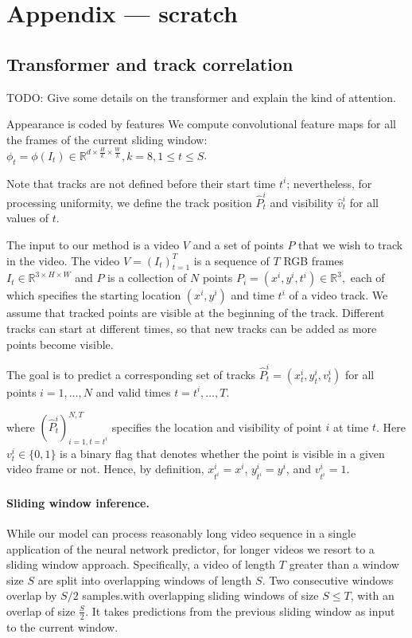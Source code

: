 \appendix\section{Appendix --- scratch}

\subsection{Transformer and track correlation}

TODO: Give some details on the transformer and explain the kind of attention.

Appearance is coded by features We compute convolutional feature maps for all the frames of the current sliding window: $\phi_t = \phi(I_t) \in \mathbb{R}^{d\times \frac{H}{k} \times \frac{W}{k}}, k=8,  1 \leq t \leq S$.


Note that tracks are not defined before their start time $t^i$; nevertheless, for processing uniformity, we define the track position $\hat P^i_t$ and visibility $\hat v^i_t$ for all values of $t$.

The input to our method is a video $V$ and a set of points $P$ that we wish to track in the video.
The video $V = (I_t)_{t=1}^T$ is a sequence of $T$ RGB frames $I_t \in \mathbb{R}^{3 \times H \times W}$ and $P$ is a collection of $N$ points
$
P_i = (x^i, y^i, t^i) \in \mathbb{R}^{3},
$
each of which specifies the starting location $(x^i, y^i)$ and time $t^i$ of a video track.
We assume that tracked points are visible at the beginning of the track.
Different tracks can start at different times, so that new tracks can be added as more points become visible.

The goal is to predict a corresponding set of tracks
$
\hat P_t^i = (x_t^i, y_t^i, v_t^i)
$
for all points $i=1,\dots,N$ and valid times $t=t^i,\dots,T$.



where
$
(\hat P_t^i)_{i=1,t=t^i}^{N,T}
$
specifies the location and visibility of point $i$ at time $t$.
Here $v_t^i \in \{0,1\}$ is a binary flag that denotes whether the point is visible in a given video frame or not.
Hence, by definition,
$
x_{t^i}^i = x^i
$,
$
y_{t^i}^i = y^i
$,
and
$
v_{t^i}^i = 1.
$

\paragraph{Sliding window inference.}

While our model can process reasonably long video sequence in a single application of the neural network predictor, for longer videos we resort to a sliding window approach.
Specifically, a video of length $T$ greater than a window size $S$ are split into overlapping windows of length $S$.
Two consecutive windows overlap by $S/2$ samples.with overlapping sliding windows of size $S\leq T$, with an overlap of size $\frac{S}{2}$. It takes predictions from the previous sliding window as input to the current window. 

